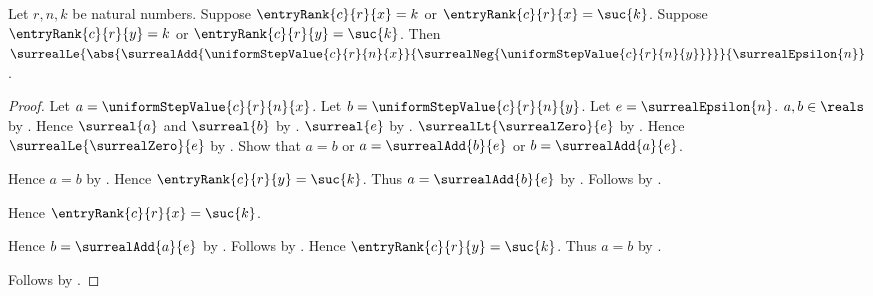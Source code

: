 \begin{proposition}\label{uniform_step_value_rank_cell_oscillation}
    Let $r,n,k$ be natural numbers.
    Suppose $\entryRank{c}{r}{x}=k$ or
        $\entryRank{c}{r}{x}=\suc{k}$.
    Suppose $\entryRank{c}{r}{y}=k$ or
        $\entryRank{c}{r}{y}=\suc{k}$.
    Then
        $\surrealLe{
            \abs{\surrealAdd{
                \uniformStepValue{c}{r}{n}{x}}
                {\surrealNeg{\uniformStepValue{c}{r}{n}{y}}}}}
            {\surrealEpsilon{n}}$.
\end{proposition}
\begin{proof}
    Let $a=\uniformStepValue{c}{r}{n}{x}$.
    Let $b=\uniformStepValue{c}{r}{n}{y}$.
    Let $e=\surrealEpsilon{n}$.
    $a,b\in\reals$ by .
    Hence $\surreal{a}$ and $\surreal{b}$
        by .
    $\surreal{e}$ by .
    $\surrealLt{\surrealZero}{e}$
        by .
    Hence $\surrealLe{\surrealZero}{e}$ by .
    Show that $a=b$ or $a=\surrealAdd{b}{e}$ or
        $b=\surrealAdd{a}{e}$.
    \begin{subproof}
        \begin{byCase}
            \begin{byCase}
                Hence $a=b$ by .
                Hence $\entryRank{c}{r}{y}=\suc{k}$.
                Thus $a=\surrealAdd{b}{e}$
                    by .
                Follows by \auto.
            \end{byCase}
            Hence $\entryRank{c}{r}{x}=\suc{k}$.
            \begin{byCase}
                Hence $b=\surrealAdd{a}{e}$
                    by .
                Follows by \auto.
                Hence $\entryRank{c}{r}{y}=\suc{k}$.
                Thus $a=b$ by .
            \end{byCase}
        \end{byCase}
    \end{subproof}
    Follows by .
\end{proof}

